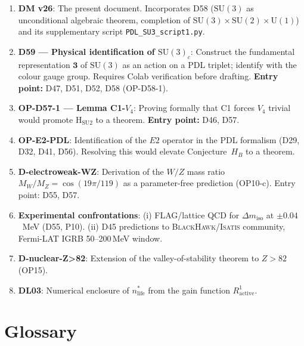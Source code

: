\documentclass[11pt,a4paper]{article}
\theoremstyle{plain}
\theoremstyle{definition}
\theoremstyle{remark}
\begin{document}
\begin{enumerate}
\item \textbf{DM v26}: The present document. Incorporates D58 ($\mathrm{SU}(3)$ as unconditional algebraic theorem, completion of $\mathrm{SU}(3)\times\mathrm{SU}(2)\times\mathrm{U}(1)$) and its supplementary script \texttt{PDL\_SU3\_script1.py}.
\item \textbf{D59 --- Physical identification of $\mathrm{SU}(3)_c$}: Construct the fundamental representation $\mathbf{3}$ of $\mathrm{SU}(3)$ as an action on a PDL triplet; identify with the colour gauge group. Requires Colab verification before drafting. \textbf{Entry point:} D47, D51, D52, D58 (OP-D58-1).
\item \textbf{OP-D57-1 --- Lemma C1-$V_4$}: Proving formally that C1 forces $V_4$ trivial would promote H$_{\mathrm{SU2}}$ to a theorem. \textbf{Entry point:} D46, D57.
\item \textbf{OP-E2-PDL}: Identification of the $E2$ operator in the PDL formalism (D29, D32, D41, D56). Resolving this would elevate Conjecture~$H_B$ to a theorem.
\item \textbf{D-electroweak-WZ}: Derivation of the $W/Z$ mass ratio $M_W/M_Z = \cos(19\pi/119)$ as a parameter-free prediction (OP10-c). Entry point: D55, D57.
\item \textbf{Experimental confrontations}: (i) FLAG/lattice QCD for $\Delta m_{\mathrm{iso}}$ at $\pm 0.04$~MeV (D55, P10). (ii) D45 predictions to \textsc{BlackHawk}/\textsc{Isatis} community, Fermi-LAT IGRB 50--200\,MeV window.
\item \textbf{D-nuclear-Z>82}: Extension of the valley-of-stability theorem to $Z>82$ (OP15).
\item \textbf{DL03}: Numerical enclosure of $n^*_{\mathrm{life}}$ from the gain function $R^1_{\mathrm{active}}$.
\end{enumerate}


\section{Glossary}
\label{sec:glossary}
\end{document}
